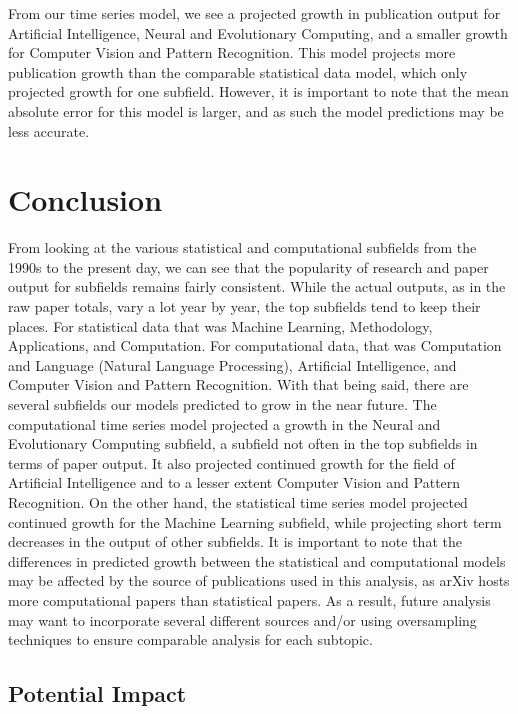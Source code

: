 \documentclass[
  12pt]{article}
\begin{document}
From our time series model, we see a projected growth in publication
output for Artificial Intelligence, Neural and Evolutionary Computing,
and a smaller growth for Computer Vision and Pattern Recognition. This
model projects more publication growth than the comparable statistical
data model, which only projected growth for one subfield. However, it is
important to note that the mean absolute error for this model is larger,
and as such the model predictions may be less accurate.

\section{Conclusion}\label{sec-conc}

From looking at the various statistical and computational subfields from
the 1990s to the present day, we can see that the popularity of research
and paper output for subfields remains fairly consistent. While the
actual outputs, as in the raw paper totals, vary a lot year by year, the
top subfields tend to keep their places. For statistical data that was
Machine Learning, Methodology, Applications, and Computation. For
computational data, that was Computation and Language (Natural Language
Processing), Artificial Intelligence, and Computer Vision and Pattern
Recognition. With that being said, there are several subfields our
models predicted to grow in the near future. The computational time
series model projected a growth in the Neural and Evolutionary Computing
subfield, a subfield not often in the top subfields in terms of paper
output. It also projected continued growth for the field of Artificial
Intelligence and to a lesser extent Computer Vision and Pattern
Recognition. On the other hand, the statistical time series model
projected continued growth for the Machine Learning subfield, while
projecting short term decreases in the output of other subfields. It is
important to note that the differences in predicted growth between the
statistical and computational models may be affected by the source of
publications used in this analysis, as arXiv hosts more computational
papers than statistical papers. As a result, future analysis may want to
incorporate several different sources and/or using oversampling
techniques to ensure comparable analysis for each subtopic.

\subsection{Potential Impact}\label{potential-impact}
\end{document}
